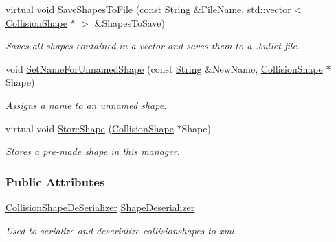 \begin{DoxyCompactItemize}
virtual void \hyperlink{classMezzanine_1_1CollisionShapeManager_af024fba16fd19e42fb6809484005f58d}{SaveShapesToFile} (const \hyperlink{namespaceMezzanine_acf9fcc130e6ebf08e3d8491aebcf1c86}{String} \&FileName, std::vector$<$ \hyperlink{classMezzanine_1_1CollisionShape}{CollisionShape} $\ast$ $>$ \&ShapesToSave)
\begin{DoxyCompactList}\small\item\em Saves all shapes contained in a vector and saves them to a .bullet file. \item\end{DoxyCompactList}\item 
void \hyperlink{classMezzanine_1_1CollisionShapeManager_a6ee3a505210dbf09c46752d1b45bbfd0}{SetNameForUnnamedShape} (const \hyperlink{namespaceMezzanine_acf9fcc130e6ebf08e3d8491aebcf1c86}{String} \&NewName, \hyperlink{classMezzanine_1_1CollisionShape}{CollisionShape} $\ast$Shape)
\begin{DoxyCompactList}\small\item\em Assigns a name to an unnamed shape. \item\end{DoxyCompactList}\item 
virtual void \hyperlink{classMezzanine_1_1CollisionShapeManager_a9873202c93a5d70327219cc700948908}{StoreShape} (\hyperlink{classMezzanine_1_1CollisionShape}{CollisionShape} $\ast$Shape)
\begin{DoxyCompactList}\small\item\em Stores a pre-\/made shape in this manager. \item\end{DoxyCompactList}\end{DoxyCompactItemize}
\subsubsection*{Public Attributes}
\begin{DoxyCompactItemize}
\item 
\hyperlink{classMezzanine_1_1CollisionShapeDeSerializer}{CollisionShapeDeSerializer} \hyperlink{classMezzanine_1_1CollisionShapeManager_a4157bd3404ced58ce49a828e46e0c110}{ShapeDeserializer}
\begin{DoxyCompactList}\small\item\em Used to serialize and deserialize collisionshapes to xml. \item\end{DoxyCompactList}\end{DoxyCompactItemize}
